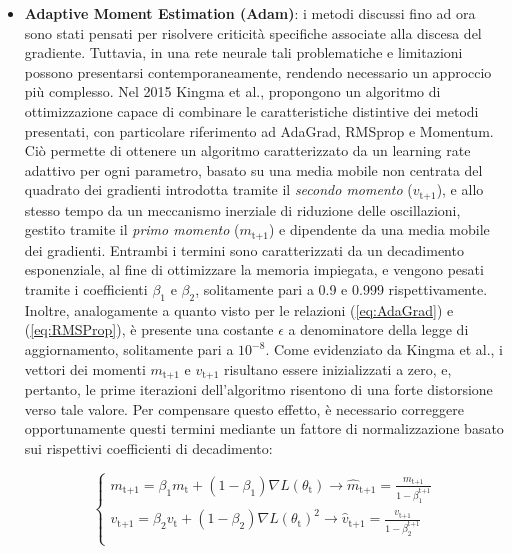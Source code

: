 \begin{itemize}
        \item \textbf{Adaptive Moment Estimation (Adam)}\cite{Adam_medium}: i metodi discussi fino ad ora sono stati pensati per risolvere criticità specifiche associate alla discesa del gradiente. Tuttavia, in una rete neurale tali problematiche e limitazioni possono presentarsi contemporaneamente, rendendo necessario un approccio più complesso. Nel 2015 Kingma et al.\cite{Adam}, propongono un algoritmo di ottimizzazione capace di combinare le caratteristiche distintive dei metodi presentati, con particolare riferimento ad AdaGrad, RMSprop e Momentum. Ciò permette di ottenere un algoritmo caratterizzato da un learning rate adattivo per ogni parametro, basato su una media mobile non centrata del quadrato dei gradienti introdotta tramite il \emph{secondo momento} ($v_{\text{t+1}}$), e allo stesso tempo da un meccanismo inerziale di riduzione delle oscillazioni, gestito tramite il \emph{primo momento} ($m_{\text{t+1}}$) e dipendente da una media mobile dei gradienti. Entrambi i termini sono caratterizzati da un decadimento esponenziale, al fine di ottimizzare la memoria impiegata, e vengono pesati tramite i coefficienti $\beta_{1}$ e $\beta_{2}$, solitamente pari a 0.9 e 0.999 rispettivamente. Inoltre, analogamente a quanto visto per le relazioni (\ref{eq:AdaGrad}) e (\ref{eq:RMSProp}), è presente una costante $\epsilon$ a denominatore della legge di aggiornamento, solitamente pari a $10^{-8}$. Come evidenziato da Kingma et al., i vettori dei momenti $m_{\text{t+1}}$ e $v_{\text{t+1}}$ risultano essere inizializzati a zero, e, pertanto, le prime iterazioni dell'algoritmo risentono di una forte distorsione verso tale valore. Per compensare questo effetto, è necessario correggere opportunamente questi termini mediante un fattore di normalizzazione basato sui rispettivi coefficienti di decadimento:
        
            \begin{equation}
                \begin{cases}
                    m_{\text{t+1}} = \displaystyle \beta_{1} m_{\text{t}} + (1 - \beta_{1}) \nabla L(\theta_{\text{t}}) \rightarrow \hat{m}_{\text{t+1}} = \frac{m_{\text{t+1}}}{1 - \beta_{1}^{\text{t+1}}}  \\[0.35cm]

                    v_{\text{t+1}} = \displaystyle \beta_{2} v_{\text{t}} + (1 - \beta_{2}) \nabla L(\theta_{\text{t}})^{2} \rightarrow \hat{v}_{\text{t+1}} = \frac{v_{\text{t+1}}}{1 - \beta_{2}^{\text{t+1}}} \\[0.35cm]


\end{cases}
\end{equation}
\end{itemize}
